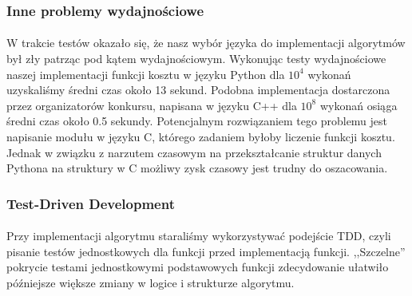 \subsubsection{Inne problemy wydajnościowe}
\paragraph{} W trakcie testów okazało się, że nasz wybór języka do implementacji algorytmów był zły patrząc pod kątem wydajnościowym. Wykonując testy wydajnościowe naszej implementacji funkcji kosztu w języku Python dla $10^4$ wykonań uzyskaliśmy średni czas około 13 sekund. Podobna implementacja dostarczona przez organizatorów konkursu, napisana w języku C++ dla $10^8$ wykonań osiąga średni czas około 0.5 sekundy. Potencjalnym rozwiązaniem tego problemu jest napisanie modułu w języku C, którego zadaniem byłoby liczenie funkcji kosztu. Jednak w związku z narzutem czasowym na przekształcanie struktur danych Pythona na struktury w C możliwy zysk czasowy jest trudny do oszacowania.

\subsubsection{Test-Driven Development}
\paragraph{} Przy implementacji algorytmu staraliśmy wykorzystywać podejście TDD, czyli pisanie testów jednostkowych dla funkcji przed implementacją funkcji. ,,Szczelne'' pokrycie testami jednostkowymi podstawowych funkcji zdecydowanie ułatwiło późniejsze większe zmiany w logice i strukturze algorytmu.



